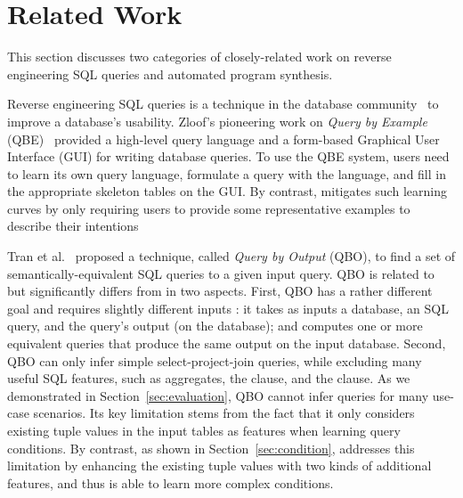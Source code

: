 
\section{Related Work}
\label{sec:related}

This section discusses two categories
of closely-related work on reverse engineering SQL queries 
and automated program synthesis.



\vspace{1mm}
Reverse engineering SQL queries is a technique in the database
community~\cite{Zloof:1975, Tran:2009, DasSarma:2010} to
improve a database's usability. 
Zloof's pioneering work on \textit{Query by Example} (QBE)~\cite{Zloof:1975}
provided a high-level query language and a
form-based Graphical User Interface (GUI) for
writing database queries. To use the QBE system, 
users need to learn its own query language,
formulate a query with the language, and fill in
the appropriate skeleton tables on the GUI.
By contrast, \ourtool mitigates such learning curves
by only requiring users to provide some representative
examples to describe their intentions




Tran et al.~\cite{Tran:2009} proposed a technique,
called \textit{Query by Output} (QBO), 
to find a set of semantically-equivalent SQL queries
to a given input query. QBO is related to but
significantly differs from \ourtool in two aspects.
First, QBO has a rather different goal and requires
slightly different inputs : it takes as inputs a database,
an SQL query, and the query's output (on the database); and computes
one or more equivalent queries that produce the
same output on the input database.
Second, QBO can only infer simple select-project-join queries,
while excluding many useful SQL features, such as aggregates,
the  clause, and the 
clause. As we demonstrated in Section~\ref{sec:evaluation},
QBO cannot infer queries for many use-case scenarios.
Its key limitation stems from the fact that it
only considers existing tuple values
in the input tables as features when learning
query conditions. 
By contrast, as shown in Section~\ref{sec:condition},
\ourtool addresses this limitation by enhancing
the existing tuple values with two kinds of
additional features, and thus is able to learn more
complex conditions.


